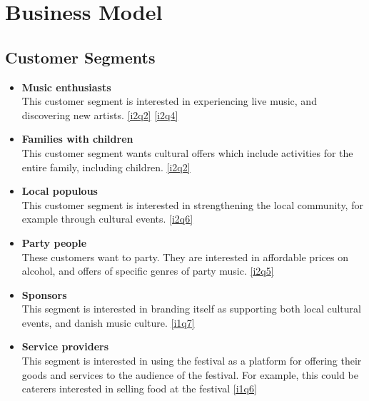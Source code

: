 \section{Business Model} %
\label{sec:business_model}
\subsection{Customer Segments} %
\label{sub:customer_segments}
\begin{itemize}
	\item \textbf{Music enthusiasts}\\
			This customer segment is interested in experiencing live music, and discovering new artists. \ref{i2q2} \ref{i2q4}
	\item \textbf{Families with children}\\
			This customer segment wants cultural offers which include activities for the entire family, including children. \ref{i2q2}
	\item \textbf{Local populous}\\
			This customer segment is interested in strengthening the local community, for example through cultural events. \ref{i2q6}
	\item \textbf{Party people}\\
			These customers want to party. They are interested in affordable prices on alcohol, and offers of specific genres of party music. \ref{i2q5}
	\item \textbf{Sponsors}\\
			This segment is interested in branding itself as supporting both local cultural events, and danish music culture. \ref{i1q7}
	\item \textbf{Service providers}\\
		This segment is interested in using the festival as a platform for offering their goods and services to the audience of the festival. For example, this could be caterers interested in selling food at the festival \ref{i1q6}
\end{itemize}
